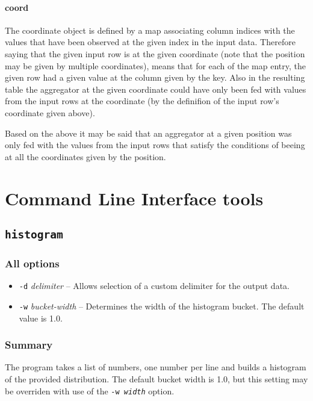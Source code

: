 \documentclass{report}
\begin{document}
	\subsubsection{coord}
	The coordinate object is defined by a map associating column indices with the
	values that have been observed at the given index in the input data. Therefore
	saying that the given input row is at the given coordinate (note that the position
	may be given by multiple coordinates), means that for each of the map entry, the
	given row had a given value at the column given by the key. Also in the resulting
	table the aggregator at the given coordinate could have only been fed with values
	from the input rows at the coordinate (by the definifion of the input row's
	coordinate given above).

	Based on the above it may be said that an aggregator at a given position was only
	fed with the values from the input rows that satisfy the conditions of beeing at
	all the coordinates given by the position.

\chapter{Command Line Interface tools}

\section{\texttt{histogram}}

	\subsection{All options}
	\begin{itemize}
		\item \texttt{-d} \textit{delimiter} -- Allows selection of a custom
			delimiter for the output data.
		\item \texttt{-w} \textit{bucket-width} -- Determines the width of the
			histogram bucket. The default value is 1.0.
	\end{itemize}

	\subsection{Summary}
	The program takes a list of numbers, one number per line and builds
	a histogram of the provided distribution. The default bucket width is 1.0,
	but this setting may be overriden with use of the \texttt{-w \textit{width}}
	option.
\end{document}
